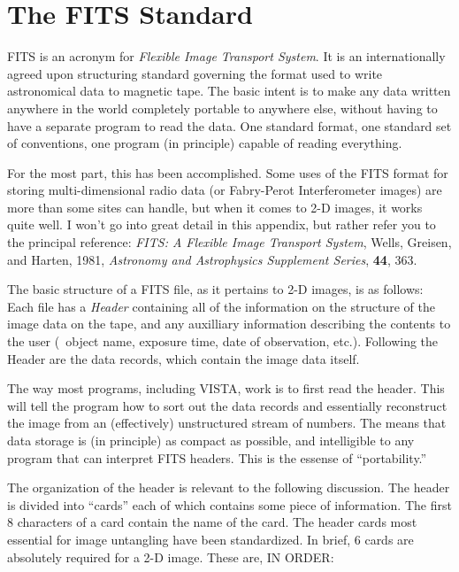 \section{The FITS Standard}

FITS is an acronym for {\it Flexible Image Transport System}.  It is an
internationally agreed upon structuring standard governing the format used to
write astronomical data to magnetic tape.  The basic intent is to make any
data written anywhere in the world completely portable to anywhere else,
without having to have a separate program to read the data.  One standard
format, one standard set of conventions, one program (in principle) capable of
reading everything.

For the most part, this has been accomplished.  Some uses of the FITS format
for storing multi-dimensional radio data (or Fabry-Perot Interferometer
images) are more than some sites can handle, but when it comes to 2-D images,
it works quite well.  I won't go into great detail in this appendix, but
rather refer you to the principal reference: {\it FITS: A Flexible Image
Transport System}, Wells, Greisen, and Harten, 1981, {\it Astronomy and
Astrophysics Supplement Series}, {\bf 44}, 363.

The basic structure of a FITS file, as it pertains to 2-D images, is as
follows:  Each file has a {\it Header} containing all of the information on
the structure of the image data on the tape, and any auxilliary information
describing the contents to the user (\eg\ object name, exposure time, date of
observation, etc.).  Following the Header are the data records, which contain
the image data itself.

The way most programs, including VISTA, work is to first read the header. This
will tell the program how to sort out the data records and essentially
reconstruct the image from an (effectively) unstructured stream of numbers.
The means that data storage is (in principle) as compact as possible, and
intelligible to any program that can interpret FITS headers.  This is the
essense of ``portability.''

The organization of the header is relevant to the following discussion. The
header is divided into ``cards'' each of which contains some piece of
information.  The first 8 characters of a card contain the name of the card.
The header cards most essential for image untangling have been standardized.
In brief, 6 cards are absolutely required for a 2-D image.  These are, IN
ORDER:

